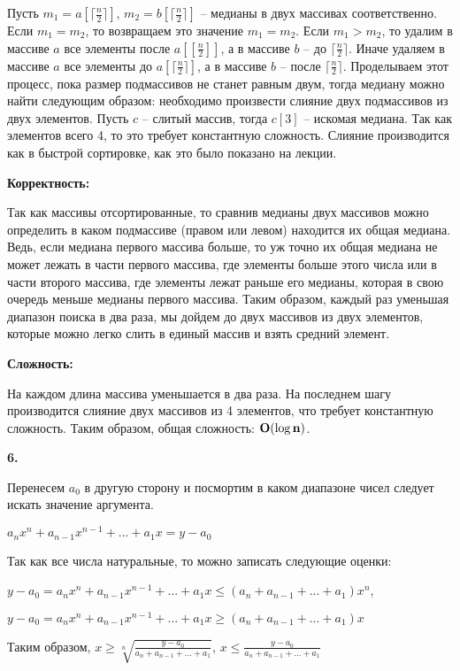 \documentclass[12pt]{extreport}
\begin{document}
Пусть $m_1 = a[\lceil \frac{n}{2}\rceil ]$, $m_2 = b[\lceil \frac{n}{2}\rceil ]$ -- медианы в двух массивах соответственно. Если $m_1 = m_2$, то возвращаем это значение $m_1 = m_2$. Если $m_1 > m_2$, то удалим в массиве $a$ все элементы после $a[[\frac{n}{2}]]$, а в массиве $b$ -- до $\lceil \frac{n}{2}\rceil $. Иначе удаляем в массиве $a$ все элементы до $a[\lceil \frac{n}{2}\rceil ]$, а в массиве $b$ -- после $\lceil \frac{n}{2}\rceil $. Проделываем этот процесс, пока размер подмассивов не станет равным двум, тогда медиану можно найти следующим образом: необходимо произвести слияние двух подмассивов из двух элементов. Пусть $c$ -- слитый массив, тогда $c[3]$ -- искомая медиана. Так как элементов всего 4, то это требует константную сложность. Слияние производится как в быстрой сортировке, как это было показано на лекции. 

\bigskip 
{\bf Корректность:}

Так как массивы отсортированные, то сравнив медианы двух массивов можно определить в каком подмассиве (правом или левом) находится их общая медиана. Ведь, если медиана первого массива больше, то уж точно их общая медиана не может лежать в части первого массива, где элементы больше этого числа или в части второго массива, где элементы лежат раньше его медианы, которая в свою очередь меньше медианы первого массива. Таким образом, каждый раз уменьшая диапазон поиска в два раза, мы дойдем до двух массивов из двух элементов, которые можно легко слить в единый массив и взять средний элемент. 

\bigskip 
{\bf Сложность:} 

На каждом длина массива уменьшается в два раза. На последнем шагу производится слияние двух массивов из 4 элементов, что требует константную сложность. Таким образом, общая сложность: $\bf{O(\log n)}$.

\bigskip 

{\bf 6.} 

Перенесем $a_0$ в другую сторону и посмортим в каком диапазоне чисел следует искать значение аргумента. 

$a_nx^n+a_{n-1}x^{n-1}+...+a_1x=y-a_0$

Так как все числа натуральные, то можно записать следующие оценки: 

$y-a_0 = a_nx^n+a_{n-1}x^{n-1}+...+a_1x \leq (a_n+a_{n-1}+...+a_1)x^n$, 

$y-a_0 = a_nx^n+a_{n-1}x^{n-1}+...+a_1x \geq (a_n+a_{n-1}+...+a_1)x$

Таким образом, $x \geq \sqrt[n]{\frac{y-a_0}{a_n+a_{n-1}+...+a_1}}$, $x \leq \frac{y-a_0}{a_n+a_{n-1}+...+a_1}$
\end{document}
